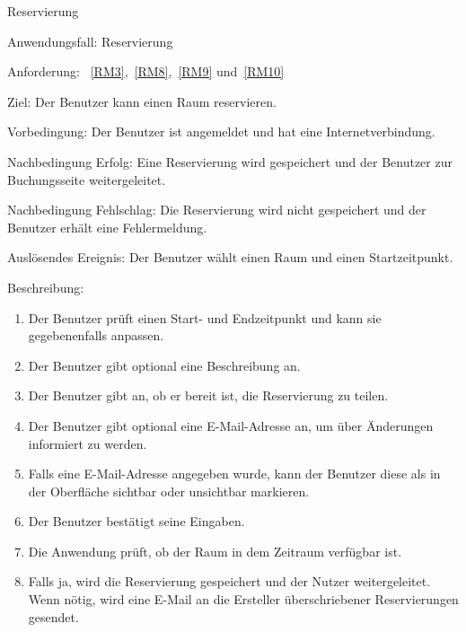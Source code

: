 \begin{function}{30}{Reservierung}
    \item[Anwendungsfall:] Reservierung
    \item[Anforderung:]~\ref{RM3},~\ref{RM8},~\ref{RM9} und~\ref{RM10}
    \item[Ziel:] Der Benutzer kann einen Raum reservieren.
    \item[Vorbedingung:] Der Benutzer ist angemeldet und hat eine Internetverbindung.
    \item[Nachbedingung Erfolg:] Eine Reservierung wird gespeichert und der Benutzer zur Buchungsseite weitergeleitet.
    \item[Nachbedingung Fehlschlag:] Die Reservierung wird nicht gespeichert und der Benutzer erhält eine Fehlermeldung.
    \item[Auslösendes Ereignis:] Der Benutzer wählt einen Raum und einen Startzeitpunkt.
    \item[Beschreibung:] ~
    \begin{enumerate}
        \item Der Benutzer prüft einen Start- und Endzeitpunkt und kann sie gegebenenfalls anpassen.
        \item Der Benutzer gibt optional eine Beschreibung an.
        \item Der Benutzer gibt an, ob er bereit ist, die Reservierung zu teilen.
        \item Der Benutzer gibt optional eine E-Mail-Adresse an, um über Änderungen informiert zu werden.
        \item Falls eine E-Mail-Adresse angegeben wurde, kann der Benutzer diese als in der Oberfläche sichtbar oder unsichtbar markieren.
        \item Der Benutzer bestätigt seine Eingaben.
        \item Die Anwendung prüft, ob der Raum in dem Zeitraum verfügbar ist.
        \item Falls ja, wird die Reservierung gespeichert und der Nutzer weitergeleitet.
              Wenn nötig, wird eine E-Mail an die Ersteller überschriebener Reservierungen gesendet.
    \end{enumerate}
\end{function}

\pagebreak

